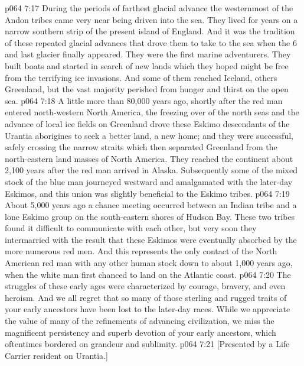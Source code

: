 \vs p064 7:17 \pc During the periods of farthest glacial advance the westernmost of the Andon tribes came very near being driven into the sea. They lived for years on a narrow southern strip of the present island of England. And it was the tradition of these repeated glacial advances that drove them to take to the sea when the 6 and last glacier finally appeared. They were the first marine adventurers. They built boats and started in search of new lands which they hoped might be free from the terrifying ice invasions. And some of them reached Iceland, others Greenland, but the vast majority perished from hunger and thirst on the open sea.
\vs p064 7:18 A little more than 80,000 years ago, shortly after the red man entered north\hyp{}western North America, the freezing over of the north seas and the advance of local ice fields on Greenland drove these Eskimo descendants of the Urantia aborigines to seek a better land, a new home; and they were successful, safely crossing the narrow straits which then separated Greenland from the north\hyp{}eastern land masses of North America. They reached the continent about 2,100 years after the red man arrived in Alaska. Subsequently some of the mixed stock of the blue man journeyed westward and amalgamated with the later\hyp{}day Eskimos, and this union was slightly beneficial to the Eskimo tribes.
\vs p064 7:19 About 5,000 years ago a chance meeting occurred between an Indian tribe and a lone Eskimo group on the south\hyp{}eastern shores of Hudson Bay. These two tribes found it difficult to communicate with each other, but very soon they intermarried with the result that these Eskimos were eventually absorbed by the more numerous red men. And this represents the only contact of the North American red man with any other human stock down to about 1,000 years ago, when the white man first chanced to land on the Atlantic coast.
\vs p064 7:20 \pc The struggles of these early ages were characterized by courage, bravery, and even heroism. And we all regret that so many of those sterling and rugged traits of your early ancestors have been lost to the later\hyp{}day races. While we appreciate the value of many of the refinements of advancing civilization, we miss the magnificent persistency and superb devotion of your early ancestors, which oftentimes bordered on grandeur and sublimity.
\vsetoff
\vs p064 7:21 [Presented by a Life Carrier resident on Urantia.]
\quizlink
